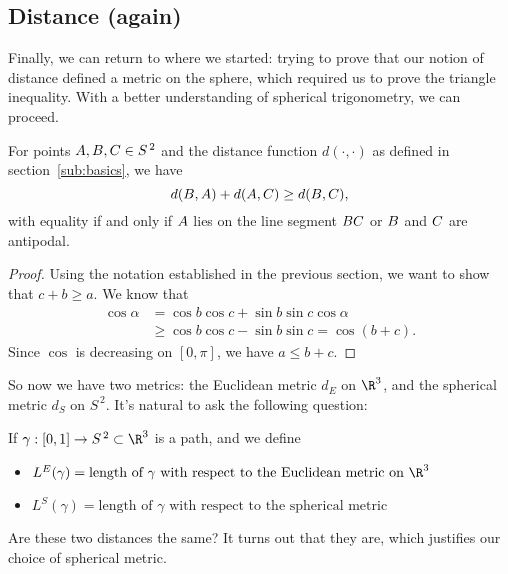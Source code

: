 
	\pagebreak

\subsection{Distance (again)} %
\label{sub:distance_again_}

Finally, we can return to where we started: trying to prove that our notion of distance defined a metric on the sphere, which required us to prove the triangle inequality. With a better understanding of spherical trigonometry, we can proceed.

\begin{corollary}
	 For points $\AA,\BB,\CC\in S^{\,2}$ and the distance function $d(\cdot,\cdot)$ as defined in section~\ref{sub:basics}, we have
	\begin{equation*}
		d(\BB,\AA) + d(\AA,\CC) \geq d(\BB,\CC),
	\end{equation*}
	with equality if and only if $\AA$ lies on the line segment $\BB\CC$ or $\BB$ and $\CC$ are antipodal. %
\end{corollary}

\begin{proof}
	Using the notation established in the previous section, we want to show that $c+b\geq a$. We know that
	\begin{align*}
		\cos\alpha
		&= \cos b \cos c + \sin b \sin c \cos \alpha \\
		&\geq \cos b \cos c - \sin b \sin c = \cos(b+c).
	\end{align*}
	Since $\cos$ is decreasing on $[0,\pi]$, we have $a\leq b+c$. %
\end{proof}

So now we have two metrics: the Euclidean metric $d_E$ on $\R^3$, and the spherical metric $d_S$ on $S^{\,2}$. It's natural to ask the following question:

If $\gamma:[0,1] \to S^{\,2} \subset \R^3$ is a path, and we define
\begin{itemize}
	\shortskip
	\item[] $L^E(\gamma) = \text{length of $\gamma$ with respect to the Euclidean metric on $\R^3$}$
	\item[] $L^S(\gamma) = \text{length of $\gamma$ with respect to the spherical metric}$
\end{itemize}
Are these two distances the same? It turns out that they are, which justifies our choice of spherical metric.

